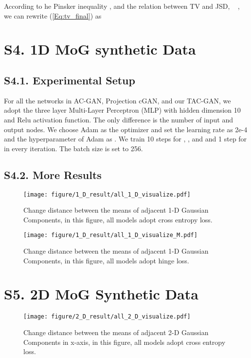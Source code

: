 According to he Pinsker inequality  \cite{Tsybakov2008}, and the relation between TV and JSD, \ie~  \cite{NIPS2018_8229}, we can rewrite (\ref{Eq:tv_final}) as


\section*{S4. 1D MoG synthetic Data}
\subsection*{S4.1. Experimental Setup}
For all the networks in AC-GAN, Projection cGAN, and our TAC-GAN, we adopt the three layer Multi-Layer Perceptron (MLP) with hidden dimension 10 and Relu \cite{relu} activation function. The only difference is the number of input and output nodes. We choose Adam \cite{adam} as the optimizer and set the learning rate as 2e-4 and the hyperparameter of Adam as . We train 10 steps for , , and  and 1 step for  in every iteration. The batch size is set to 256.

\subsection*{S4.2. More Results}

\begin{figure}[H]
\centering\texttt{[image: figure/1\_D\_result/all\_1\_D\_visualize.pdf]}
  \caption{Change distance between the means of adjacent 1-D Gaussian Components, in this figure, all models adopt cross entropy loss.}
  \label{all_1_D}
\end{figure}

\begin{figure}[H]
\centering\texttt{[image: figure/1\_D\_result/all\_1\_D\_visualize\_M.pdf]}
  \caption{Change distance between the means of adjacent 1-D Gaussian Components, in this figure, all models adopt hinge loss.}
  \label{all_1_D_M}
\end{figure}
\section*{S5. 2D MoG Synthetic Data}

\begin{figure}[H]
\centering\texttt{[image: figure/2\_D\_result/all\_2\_D\_visualize.pdf]}
  \caption{Change distance between the means of adjacent 2-D Gaussian Components in x-axis, in this figure, all models adopt cross entropy loss.}
  \label{all_1_D}
\end{figure}



